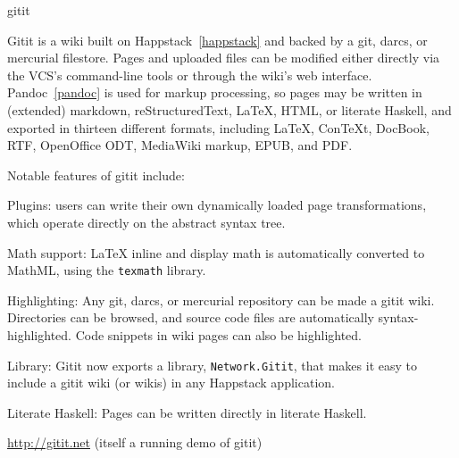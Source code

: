 \begin{hcarentry}[updated]{gitit}
\label{gitit}
\makeheader

Gitit is a wiki built on Happstack~\cref{happstack} and backed by a git, darcs, or mercurial
filestore. Pages and uploaded files can be modified either directly
via the VCS's command-line tools or through the wiki's web interface.
Pandoc~\cref{pandoc} is used for markup processing, so pages may be written in
(extended) markdown, reStructuredText, LaTeX, HTML, or literate Haskell,
and exported in thirteen different formats, including LaTeX, ConTeXt,
DocBook, RTF, OpenOffice ODT, MediaWiki markup, EPUB, and PDF.

Notable features of gitit include:
\begin{compactitem}
\item
  Plugins: users can write their own dynamically loaded page transformations,
  which operate directly on the abstract syntax tree.
\item
  Math support:  LaTeX inline and display math is automatically converted
  to MathML, using the \texttt{texmath} library.
\item
  Highlighting:  Any git, darcs, or mercurial repository can be made a gitit wiki.
  Directories can be browsed, and source code files are
  automatically syntax-highlighted.  Code snippets in wiki pages
  can also be highlighted.
\item
  Library: Gitit now exports a library, \texttt{Network.Gitit}, that makes it
  easy to include a gitit wiki (or wikis) in any Happstack application.
\item
  Literate Haskell: Pages can be written directly in literate Haskell.
\end{compactitem}

\FurtherReading
\url{http://gitit.net} (itself
a running demo of gitit)
\end{hcarentry}
